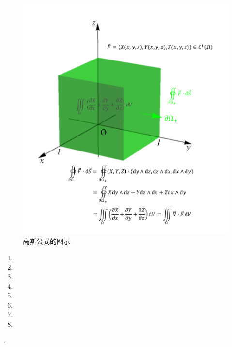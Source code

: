 \documentclass[12pt,UTF8,fleqn]{ctexart}
\begin{document}
\begin{enumerate}
\begin{enumerate}
\begin{figure}[H]
\begin{center}
\includegraphics[height=0.618\textheight,angle=0]{Figures20190613/Gauss.pdf}
\end{center}
\caption{高斯公式的图示}
\end{figure}
\end{enumerate}
\begin{enumerate}
\item[]
\item[]
\item[]
\item[]
\item[]
\item[]
\item[]
\item[]
\end{enumerate}
.
\begin{figure}[H]
\begin{center}

\end{center}
\end{figure}
\end{enumerate}
\end{document}

